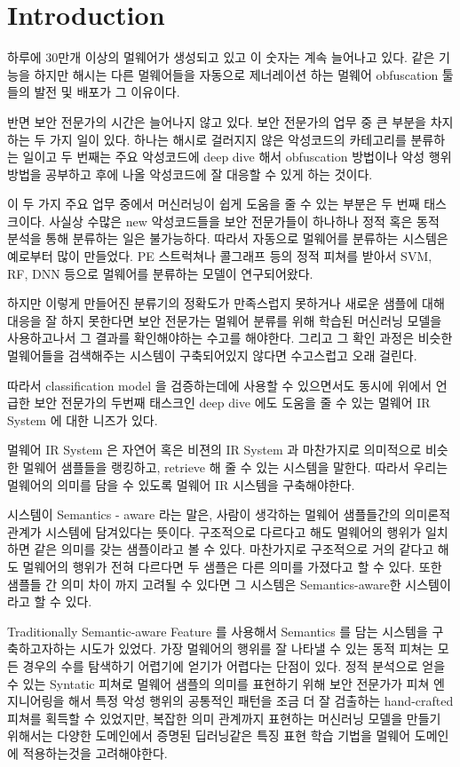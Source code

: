 \section{Introduction}


하루에 30만개 이상의 멀웨어가 생성되고 있고 이 숫자는 계속 늘어나고 있다. %
같은 기능을 하지만 해시는 다른 멀웨어들을 자동으로 제너레이션 하는 멀웨어 obfuscation 툴들의 발전 및 배포가 그 이유이다. 

반면 보안 전문가의 시간은 늘어나지 않고 있다. 보안 전문가의 업무 중 큰 부분을 차지하는 두 가지 일이 있다. 하나는 해시로 걸러지지 않은 악성코드의 카테고리를 분류하는 일이고 두 번째는 주요 악성코드에 deep dive 해서 obfuscation 방법이나 악성 행위 방법을 공부하고 후에 나올 악성코드에 잘 대응할 수 있게 하는 것이다.   

이 두 가지 주요 업무 중에서 머신러닝이 쉽게 도움을 줄 수 있는 부분은 두 번째 태스크이다. 사실상 수많은 new 악성코드들을 보안 전문가들이 하나하나 정적 혹은 동적 분석을 통해 분류하는 일은 불가능하다. 따라서 자동으로 멀웨어를 분류하는 시스템은 예로부터 많이 만들었다. PE 스트럭쳐나 콜그래프 등의 정적 피쳐를 받아서 SVM, RF, DNN 등으로 멀웨어를 분류하는 모델이 연구되어왔다.   

하지만 이렇게 만들어진 분류기의 정확도가 만족스럽지 못하거나 새로운 샘플에 대해 대응을 잘 하지 못한다면 보안 전문가는 멀웨어 분류를 위해 학습된 머신러닝 모델을 사용하고나서 그 결과를 확인해야하는 수고를 해야한다. 그리고 그 확인 과정은 비슷한 멀웨어들을 검색해주는 시스템이 구축되어있지 않다면 수고스럽고 오래 걸린다. 

따라서 classification model 을 검증하는데에 사용할 수 있으면서도 동시에 위에서 언급한 보안 전문가의 두번째 태스크인 deep dive 에도 도움을 줄 수 있는 멀웨어 IR System 에 대한 니즈가 있다.  

멀웨어 IR System 은 자연어 혹은 비젼의 IR System 과 마찬가지로 의미적으로 비슷한 멀웨어 샘플들을 랭킹하고, retrieve 해 줄 수 있는 시스템을 말한다. 따라서 우리는 멀웨어의 의미를 담을 수 있도록 멀웨어 IR 시스템을 구축해야한다. 

시스템이 Semantics - aware 라는 말은, 사람이 생각하는 멀웨어 샘플들간의 의미론적 관계가 시스템에 담겨있다는 뜻이다. 구조적으로 다르다고 해도 멀웨어의 행위가 일치하면 같은 의미를 갖는 샘플이라고 볼 수 있다. 마찬가지로 구조적으로 거의 같다고 해도 멀웨어의 행위가 전혀 다르다면 두 샘플은 다른 의미를 가졌다고 할 수 있다. 또한 샘플들 간 의미 차이 까지 고려될 수 있다면 그 시스템은 Semantics-aware한 시스템이라고 할 수 있다. 
 
Traditionally Semantic-aware Feature 를 사용해서 Semantics 를 담는 시스템을 구축하고자하는 시도가 있었다. 가장 멀웨어의 행위를 잘 나타낼 수 있는 동적 피쳐는 모든 경우의 수를 탐색하기 어렵기에 얻기가 어렵다는 단점이 있다. 정적 분석으로 얻을 수 있는 Syntatic 피쳐로 멀웨어 샘플의 의미를 표현하기 위해 보안 전문가가 피쳐 엔지니어링을 해서 특정 악성 행위의 공통적인 패턴을 조금 더 잘 검출하는 hand-crafted 피쳐를 획득할 수 있었지만, 복잡한 의미 관계까지 표현하는 머신러닝 모델을 만들기 위해서는 다양한 도메인에서 증명된 딥러닝같은 특징 표현 학습 기법을 멀웨어 도메인에 적용하는것을 고려해야한다.
 
